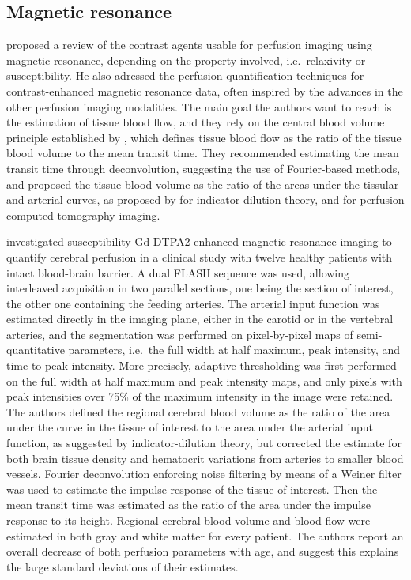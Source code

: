 \subsection{Magnetic resonance}
\citet{Rosen:1990hz} proposed a review of the contrast agents usable for perfusion imaging using magnetic resonance, depending on the property involved, i.e.~relaxivity or susceptibility. 
He also adressed the perfusion quantification techniques for contrast-enhanced magnetic resonance data, often inspired by the advances in the other perfusion imaging modalities.
The main goal the authors want to reach is the estimation of tissue blood flow, and they rely on the central blood volume principle established by \citet{Stewart:1897dz}, which defines tissue blood flow as the ratio of the tissue blood volume to the mean transit time.
They recommended estimating the mean transit time through deconvolution, suggesting the use of Fourier-based methods, and proposed the tissue blood volume as the ratio of the areas under the tissular and arterial curves, as proposed by \citet{Lassen:1979vj} for indicator-dilution theory, and \citet{Axel:1980jg} for perfusion computed-tomography imaging.

\citet{Rempp:1994kk} investigated susceptibility Gd-DTPA2-enhanced magnetic resonance imaging to quantify cerebral perfusion in a clinical study with twelve healthy patients with intact blood-brain barrier.
A dual FLASH sequence was used, allowing interleaved acquisition in two parallel sections, one being the section of interest, the other one containing the feeding arteries.
The arterial input function was estimated directly in the imaging plane, either in the carotid or in the vertebral arteries, and the segmentation was performed on pixel-by-pixel maps of semi-quantitative parameters, i.e.~the full width at half maximum, peak intensity, and time to peak intensity.
More precisely, adaptive thresholding was first performed on the full width at half maximum and peak intensity maps, and only pixels with peak intensities over 75\% of the maximum intensity in the image were retained.
The authors defined the regional cerebral blood volume as the ratio of the area under the curve in the tissue of interest to the area under the arterial input function, as suggested by indicator-dilution theory, but corrected the estimate for both brain tissue density and hematocrit variations from arteries to smaller blood vessels.
Fourier deconvolution enforcing noise filtering by means of a Weiner filter was used to estimate the impulse response of the tissue of interest.
Then the mean transit time was estimated as the ratio of the area under the impulse response to its height.
Regional cerebral blood volume and blood flow were estimated in both gray and white matter for every patient.
The authors report an overall decrease of both perfusion parameters with age, and suggest this explains the large standard deviations of their estimates.

